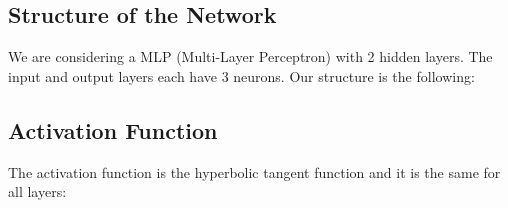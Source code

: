 \documentclass{article}
\def\nstyle{int(\lay<\Nnodlen?min(2,\lay):3)} %
\begin{document}
\subsection*{Structure of the Network}

We are considering a MLP (Multi-Layer Perceptron) with 2 hidden layers. The input and output layers each have 3 neurons. 
Our structure is the following:

\begin{center}
\end{center}

\subsection*{Activation Function}

The activation function is the hyperbolic tangent function and it is the same for all layers:
\end{document}
